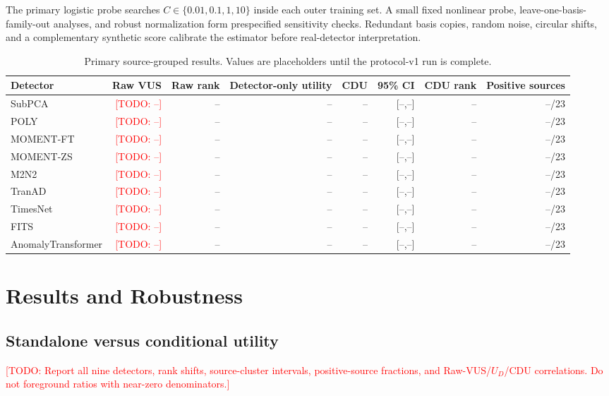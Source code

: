 \documentclass[conference]{IEEEtran}
\newcommand{\todo}[1]{\textcolor{red}{[TODO: #1]}}
\begin{document}
The primary logistic probe searches $C\in\{0.01,0.1,1,10\}$ inside each outer training set. A small fixed nonlinear probe, leave-one-basis-family-out analyses, and robust normalization form prespecified sensitivity checks. Redundant basis copies, random noise, circular shifts, and a complementary synthetic score calibrate the estimator before real-detector interpretation.

\begin{table}[t]
\centering
\caption{Primary source-grouped results. Values are placeholders until the protocol-v1 run is complete.}
\label{tab:main}
\small
\begin{tabular}{lrrrrrrr}
\toprule
Detector & Raw VUS & Raw rank & Detector-only utility & CDU & 95\% CI & CDU rank & Positive sources\\
\midrule
SubPCA & \todo{--} & -- & -- & -- & [--,--] & -- & --/23\\
POLY & \todo{--} & -- & -- & -- & [--,--] & -- & --/23\\
MOMENT-FT & \todo{--} & -- & -- & -- & [--,--] & -- & --/23\\
MOMENT-ZS & \todo{--} & -- & -- & -- & [--,--] & -- & --/23\\
M2N2 & \todo{--} & -- & -- & -- & [--,--] & -- & --/23\\
TranAD & \todo{--} & -- & -- & -- & [--,--] & -- & --/23\\
TimesNet & \todo{--} & -- & -- & -- & [--,--] & -- & --/23\\
FITS & \todo{--} & -- & -- & -- & [--,--] & -- & --/23\\
AnomalyTransformer & \todo{--} & -- & -- & -- & [--,--] & -- & --/23\\
\bottomrule
\end{tabular}
\end{table}

\section{Results and Robustness}
\subsection{Standalone versus conditional utility}
\todo{Report all nine detectors, rank shifts, source-cluster intervals, positive-source fractions, and Raw-VUS/$U_D$/CDU correlations. Do not foreground ratios with near-zero denominators.}
\end{document}
